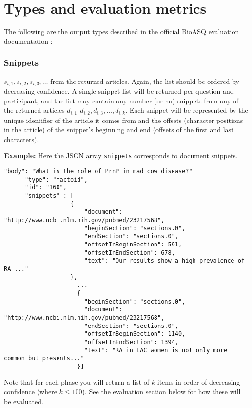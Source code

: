 \section{Types and evaluation metrics}
The following  are the output types described in the official BioASQ evaluation documentation \cite{145}:
\subsubsection{Snippets}
\begin{displayquote}
$s_{i,1} , s_{i,2}, s_{i,3}, \hdots$ from the returned articles. Again, the list should be ordered by decreasing confidence. A single snippet list will be returned per question and participant, and the list may contain any number (or no) snippets from any of the returned articles $d_{i,1}, d_{i,2}, d_{i,3}, \hdots, d_{i,k}$. Each snippet will be represented by the unique identifier of the article it comes from and the offsets (character positions in the article) of the snippet’s beginning and end (offsets of the first and last characters).
\end{displayquote}
\textbf{Example:} Here the JSON array \verb|snippets| corresponds to document snippets.  
\small
\begin{verbatim}
"body": "What is the role of PrnP in mad cow disease?", 
      "type": "factoid", 
      "id": "160",
      "snippets" : [ 
                   {
                       "document": "http://www.ncbi.nlm.nih.gov/pubmed/23217568", 
                       "beginSection": "sections.0", 
                       "endSection": "sections.0", 
       	               "offsetInBeginSection": 591, 
                       "offsetInEndSection": 678, 
                       "text": "Our results show a high prevalence of RA ..."
                   },
	                 ...
	                 {
                       "beginSection": "sections.0", 
                       "document": "http://www.ncbi.nlm.nih.gov/pubmed/23217568", 
                       "endSection": "sections.0", 
                       "offsetInBeginSection": 1140, 
                       "offsetInEndSection": 1394, 
                       "text": "RA in LAC women is not only more common but presents..."
	                 }]
\end{verbatim}
\normalsize
Note that for each phase you will return a list of $k$ items in order of decreasing confidence (where $k \leq 100$). See the evaluation section below for how these will be evaluated. 
  
